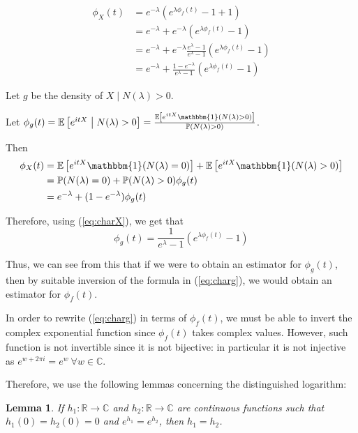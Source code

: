 \documentclass[a4paper,11pt]{article}
\theoremstyle{theorem}
\newtheorem{lem}{Lemma}[section]
\theoremstyle{definition}
\providecommand{\E}{\mathbb{E}}
\begin{document}
\begin{align}
\phi_{X}(t) &= e^{-\lambda}(e^{\lambda \phi_{f}(t)} - 1 + 1) \nonumber \\
		    &= e^{-\lambda} + e^{-\lambda}(e^{\lambda \phi_{f}(t)} - 1) \nonumber \\
		    &= e^{-\lambda} + e^{-\lambda}\frac{e^{\lambda} - 1}{e^{\lambda} - 1}(e^{\lambda \phi_{f}(t)} - 1) \nonumber \\
		    &= e^{-\lambda} + \frac{1 - e^{-\lambda}}{e^{\lambda} - 1}(e^{\lambda \phi_{f}(t)} - 1) \label{eq:charX}
\end{align}

Let $g$ be the density of $X \;|\; N(\lambda) > 0$. 

Let $\phi_{g}(t) = \E \left[ e^{itX} \;\middle|\; N(\lambda) > 0 \right] = \frac{\E \left[ e^{itX} \mathbbm{1}(N(\lambda) > 0) \right]}{\mathbb{P}(N(\lambda) > 0)}$.

Then
\begin{align*}
\phi_{X}(t) &= \E \left[ e^{itX} \mathbbm{1}(N(\lambda) = 0) \right] + \E \left[ e^{itX} \mathbbm{1}(N(\lambda) > 0) \right] \\
            &= \mathbb{P}(N(\lambda) = 0) + \mathbb{P}(N(\lambda) > 0) \phi_{g}(t) \\
            &= e^{-\lambda} + (1 - e^{-\lambda})\phi_{g}(t)
\end{align*}

Therefore, using (\ref{eq:charX}), we get that
\begin{equation}
\phi_{g}(t) = \frac{1}{e^{\lambda} - 1}(e^{\lambda \phi_{f}(t)} - 1) \label{eq:charg}
\end{equation}

Thus, we can see from this that if we were to obtain an estimator for $\phi_{g}(t)$, then by suitable inversion of the formula in (\ref{eq:charg}), we would obtain an estimator for $\phi_{f}(t)$.

In order to rewrite (\ref{eq:charg}) in terms of $\phi_{f}(t)$, we must be able to invert the complex exponential function since $\phi_{f}(t)$ takes complex values. However, such function is not invertible since it is not bijective: in particular it is not injective as $e^{w + 2 \pi i} = e^{w} \ \forall w \in \mathbb{C}$.

Therefore, we use the following lemmas concerning the distinguished logarithm:

\begin{lem} \label{lma1}
If $h_{1} : \mathbb{R} \to \mathbb{C}$ and $h_{2} : \mathbb{R} \to \mathbb{C}$ are continuous functions such that $h_{1}(0) = h_{2}(0) = 0$ and $e^{h_{1}} = e^{h_{2}}$, then $h_{1} = h_{2}$. 
\end{lem}
\end{document}
